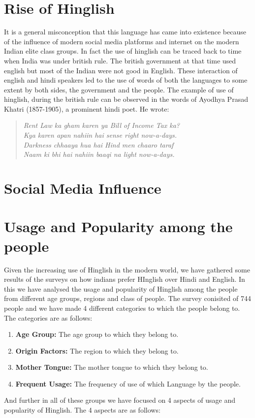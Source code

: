 \documentclass{article}
\begin{document}
\section{Rise of Hinglish}
It is a general misconception that this language has came into existence because of the influence of modern social media platforms and internet on the modern Indian elite class groups. In fact the use of hinglish can be traced back to time when India was under british rule. The british government at that time used english but most of the Indian were not good in English. These interaction of english and hindi speakers led to the use of words of both the languages to some extent by both sides, the government and the people. The example of use of hinglish, during the british rule can be observed in the words of Ayodhya Prasad Khatri (1857-1905), a prominent hindi poet. He wrote:
\begin{quote}
    \centering
    \textit{Rent Law ka gham karen ya Bill of Income Tax ka?\\
    Kya karen apan nahiin hai sense right now-a-days.\\Darkness chhaaya hua hai Hind men chaaro taraf\\
    Naam ki bhi hai nahiin baaqi na light now-a-days.}
\end{quote} 


\section{Social Media Influence}


\section{Usage and Popularity among the people}
Given the increasing use of Hinglish in the modern world, we have gathered some results of the surveys on how indians prefer HInglish over Hindi and English. In this we have analysed the usage and popularity of Hinglish among the people from different age groups, regions and class of people. The survey conisited of 744 people and we have made 4 different categories to which the people belong to. The categories are as follows:
\begin{enumerate}
    \item \textbf{Age Group:} The age group to which they belong to.
    \item \textbf{Origin Factors:} The region to which they belong to.
    \item \textbf{Mother Tongue:} The mother tongue to which they belong to.
    \item \textbf{Frequent Usage:} The frequency of use of which Language by the people.
\end{enumerate}
And further in all of these groups we have focused on 4 aspects of usage and popularity of Hinglish. The 4 aspects are as follows:
\end{document}
